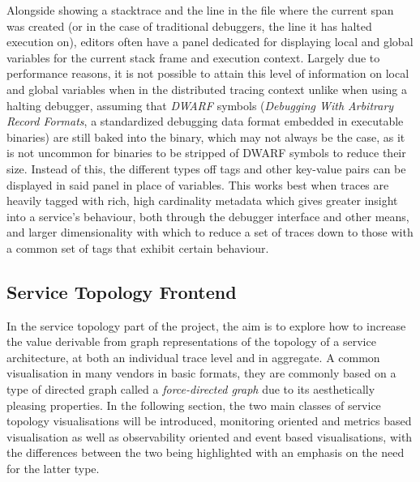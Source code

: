 \documentclass[12pt,pdftex,titlepage]{report}
\begin{document}
                Alongside showing a stacktrace and the line in the file where the current span was created (or in the case of traditional debuggers, the line it has halted execution on),
                editors often have a panel dedicated for displaying local and global variables for the current stack frame and execution context. Largely due to performance reasons, it is
                not possible to attain this level of information on local and global variables when in the distributed tracing context unlike when using a halting debugger, assuming that 
                \textit{DWARF} symbols (\textit{Debugging With Arbitrary Record Formats}, a standardized debugging data format embedded in executable binaries)\cite{dwarf} are still baked 
                into the binary, which may not always be the case, as it is not uncommon for binaries to be stripped of DWARF symbols to reduce their size. Instead of this, the different types off
                tags and other key-value pairs can be displayed in said panel in place of variables. This works best when traces are heavily tagged with rich, high cardinality metadata which gives 
                greater insight into a service's behaviour, both through the debugger interface and other means, and larger dimensionality with which to reduce a set of traces down to those with 
                a common set of tags that exhibit certain behaviour.

            \subsection{Service Topology Frontend}
                In the service topology part of the project, the aim is to explore how to increase the value derivable from graph representations of the topology of a service architecture, at 
                both an individual trace level and in aggregate. A common visualisation in many vendors in basic formats, they are commonly based on a type of directed graph called a 
                \textit{force-directed graph} due to its aesthetically pleasing properties. In the following section, the two main classes of service topology visualisations will be introduced,
                monitoring oriented and metrics based visualisation as well as observability oriented and event based visualisations, with the differences between the two being highlighted with an 
                emphasis on the need for the latter type.
        
\end{document}
